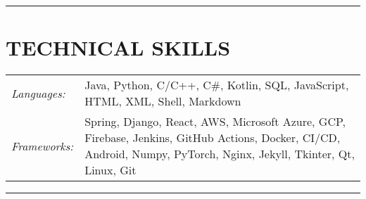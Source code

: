 \documentclass{res}
\begin{document}
\begin{resume}
\vspace{-8pt}
\hspace{-0.55in}
\noindent\rule[0.25\baselineskip]{19.36cm}{0.5pt}    
      
\vspace{-0.2in}
\section{TECHNICAL SKILLS}  
    \vspace{+0.1in}
    \hspace{-0.12in} 
    \begin{tabular}{l p{5.5in}}
    \rule{0in}{0.2in}
    {\sl Languages:} & Java, Python, C/C++, C\#, Kotlin, SQL, JavaScript, HTML, XML,  
                        Shell, Markdown \\ 
    \rule{0in}{0.2in}
    {\sl Frameworks:} & Spring, Django, React, AWS, Microsoft Azure, GCP, Firebase, Jenkins, GitHub Actions, Docker, CI/CD,
                        Android, Numpy, PyTorch, Nginx, Jekyll, Tkinter, Qt, Linux, Git
    \end{tabular}   

\vspace{-2pt}
\hspace{-0.55in}
\noindent\rule[0.25\baselineskip]{19.36cm}{0.5pt}    

\vspace{-0.2in}

\end{resume}
\end{document}

